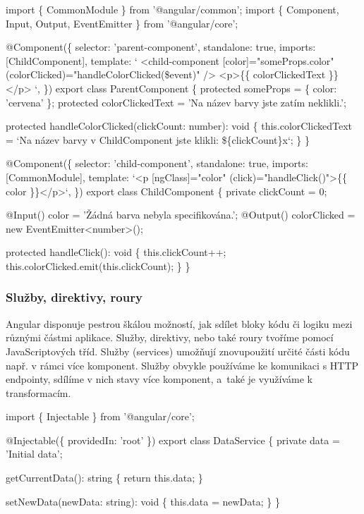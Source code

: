\begin{prog}
import \{ CommonModule \} from '@angular/common';
import \{ Component, Input, Output, EventEmitter \} from '@angular/core';

@Component(\{
  selector: 'parent-component',
  standalone: true,
  imports: [ChildComponent],
  template: `
    <child-component 
      [color]="someProps.color" 
      (colorClicked)="handleColorClicked(\$event)" 
    />
    <p>\{\{ colorClickedText \}\}</p>
  `,
\})
export class ParentComponent \{
  protected someProps = \{ color: 'cervena' \};
  protected colorClickedText = 'Na název barvy jste zatím neklikli.';

  protected handleColorClicked(clickCount: number): void \{
    this.colorClickedText = `Na název barvy 
      v ChildComponent jste klikli: \$\{clickCount\}x`;
  \}
\}

@Component(\{
  selector: 'child-component',
  standalone: true,
  imports: [CommonModule],
  template: `<p [ngClass]="color" (click)="handleClick()">\{\{ color \}\}</p>`,
\})
export class ChildComponent \{
  private clickCount = 0;

  @Input() color = 'Žádná barva nebyla specifikována.';
  @Output() colorClicked = new EventEmitter<number>();

  protected handleClick(): void \{
    this.clickCount++;
    this.colorClicked.emit(this.clickCount);
  \}
\}
\end{prog}

\subsubsection{Služby, direktivy, roury}

Angular disponuje pestrou škálou možností, jak sdílet bloky kódu či logiku mezi různými částmi aplikace. Služby, direktivy, nebo také roury tvoříme pomocí JavaScriptových tříd. 
Služby (services) umožňují znovupoužití určité části kódu např. v rámci více komponent. 
Služby obvykle používáme ke komunikaci s HTTP endpointy, sdílíme v nich stavy více komponent, a~také je využíváme k transformacím.\cite{angulardev,learningangular}

\begin{prog}
import \{ Injectable \} from '@angular/core';
  
@Injectable(\{ providedIn: 'root' \})
export class DataService \{
  private data = 'Initial data';

  getCurrentData(): string \{
    return this.data;
  \}
      
  setNewData(newData: string): void \{
    this.data = newData;
  \}
\}
\end{prog}

